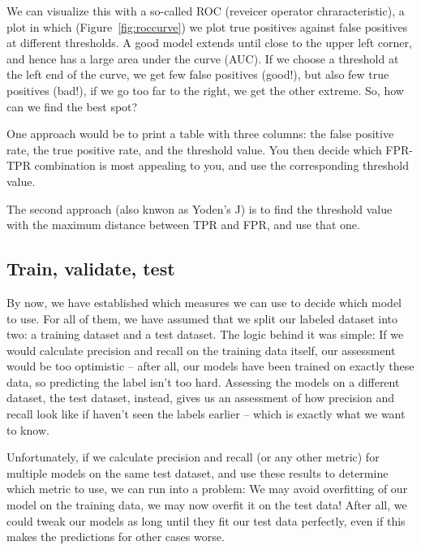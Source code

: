 We can visualize this with a so-called ROC (reveicer operator
chraracteristic), a plot in which (Figure~\ref{fig:roccurve}) we plot
true positives against false positives at different thresholds.  A
good model extends until close to the upper left corner, and hence has
a large area under the curve (AUC).  If we choose a threshold at the
left end of the curve, we get few false positives (good!), but also
few true positives (bad!), if we go too far to the right, we get
the other extreme. So, how can we find the best spot?

One approach would be to print a table with three columns: the false
positive rate, the true positive rate, and the threshold value. You
then decide which FPR-TPR combination is most appealing to you, and
use the corresponding threshold value.

The second approach (also knwon as Yoden's J) is to find the threshold
value with the maximum distance between TPR and FPR, and use that one.



\subsection{Train, validate, test}
\label{sec:train}

By now, we have established which measures we can use to decide which
model to use. For all of them, we have assumed that we split our
labeled dataset into two: a training dataset and a test dataset. The
logic behind it was simple: If we would calculate precision and recall
on the training data itself, our assessment would be too optimistic --
after all, our models have been trained on exactly these data, so
predicting the label isn't too hard. Assessing the models on a different
dataset, the test dataset, instead, gives us an assessment of how
precision and recall look like if haven't seen the labels earlier --
which is exactly what we want to know.

Unfortunately, if we calculate precision and recall (or any other
metric) for multiple models on the same test dataset, and use these
results to determine which metric to use, we can run into a problem:
We may avoid overfitting of our model on the training data, we may now
overfit it on the test data! After all, we could tweak our models as
long until they fit our test data perfectly, even if this makes the
predictions for other cases worse.

